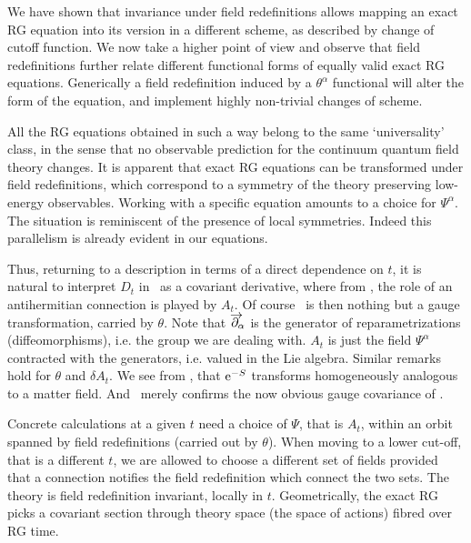 We have shown that invariance
under field redefinitions allows mapping an exact
RG equation into its version in a different scheme,
as described by change of cutoff function.
We now take a higher point of view and observe that
field redefinitions further
relate different functional forms of equally valid
exact RG equations. Generically a field redefinition
induced by a $\theta^\alpha$ functional
will alter the form of the equation, and implement highly 
non-trivial changes of scheme. 

All the RG equations obtained in such
a way belong to the same `universality' class, in the sense
that no observable prediction for the continuum quantum
field theory changes.
It is apparent that exact RG equations can be transformed
under field redefinitions, which correspond to a symmetry
of the theory preserving low-energy observables. Working 
with a specific equation amounts to a choice for $\Psi^\alpha$.
The situation is reminiscent of the presence of local
symmetries. Indeed this parallelism is already evident
in our equations. 

Thus, returning to a description in terms of a direct dependence on $t$,
it is natural to interpret $D_t$ in \simplerg\ as
a covariant derivative, where from \gadf, the role of an 
antihermitian connection is played by $A_t$.
Of course \gaa\ is then nothing but a gauge transformation,
carried by $\theta$.
Note that  $\rpartial_\alpha$ is the generator of reparametrizations
(diffeomorphisms), i.e. the group we are dealing with. $A_t$ is just the 
field $\Psi^\alpha$ contracted with the generators, i.e. valued in the
Lie algebra. Similar remarks hold for $\theta$ and $\delta A_t$.  
We see from \gas, that ${\rm e}^{-S}$ transforms homogeneously
analogous to a matter field. And \gaerg\ merely confirms the now obvious
gauge covariance of \simplerg. 

Concrete
calculations at a given $t$ need  a choice of  $\Psi$, that is $A_t$,
within an orbit spanned by field redefinitions (carried out by
$\theta$). When moving to a lower cut-off, that is a different
$t$, we are allowed to choose a different set of fields
provided that a connection notifies the field redefinition
which connect the two sets. The theory is field
redefinition invariant, locally in $t$.
Geometrically, the exact RG picks a covariant section
through theory space (\aka the space of actions) fibred over RG time.


